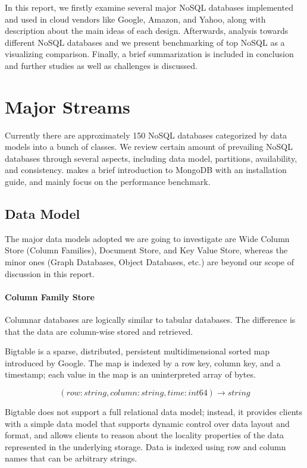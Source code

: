 \documentclass[12pt,letter]{article}
\begin{document}
In this report, we firstly examine several major NoSQL databases implemented and used in cloud vendors like Google, Amazon, and Yahoo, along with description about the main ideas of each design. Afterwards, analysis towards different NoSQL databases and we present benchmarking of top NoSQL as a visualizing comparison. Finally, a brief summarization is included in conclusion and further studies as well as challenges is discussed.

\section{Major Streams}
Currently there are approximately 150 NoSQL databases categorized by data models into a bunch of classes.\citep{Unknown2012} We review certain amount of prevailing NoSQL databases through several aspects, including data model, partitions, availability, and consistency. \citep{Suter2012} makes a brief introduction to MongoDB with an installation guide, and mainly focus on the performance benchmark.

\subsection{Data Model}
The major data models adopted we are going to investigate are Wide Column Store (Column Families), Document Store, and Key Value Store, whereas the minor ones (Graph Databases, Object Databases, etc.) are beyond our scope of discussion in this report.

\paragraph*{Column Family Store}
Columnar databases are logically similar to tabular databases. The difference is that the data are  column-wise stored and retrieved.

Bigtable\citep{Chang2006} is a sparse, distributed, persistent multidimensional sorted map introduced by Google. The map is indexed by a row key, column key, and a timestamp; each value in the map is an uninterpreted array of bytes.

\[ (row:string, column:string, time:int64) \rightarrow string \]

Bigtable does not support a full relational data model; instead, it provides clients with a simple data model that supports dynamic control over data layout and format, and allows clients to reason about the locality properties of the data represented in the underlying storage. Data is indexed using row and column names that can be arbitrary strings. 
\end{document}
